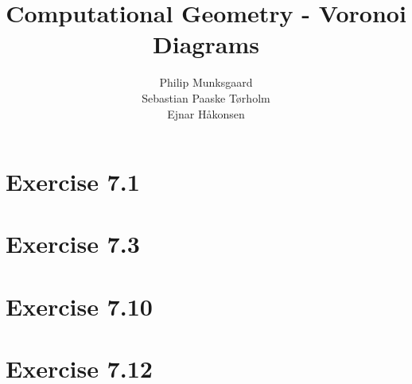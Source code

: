 \documentclass[11pt,a4paper]{article}
\title{Computational Geometry - Voronoi Diagrams}
\author{Philip Munksgaard \\ Sebastian Paaske Tørholm \\ Ejnar Håkonsen}
\begin{document}
\maketitle

\section{Exercise 7.1}

\section{Exercise 7.3}

\section{Exercise 7.10}

\section{Exercise 7.12}
\end{document}

